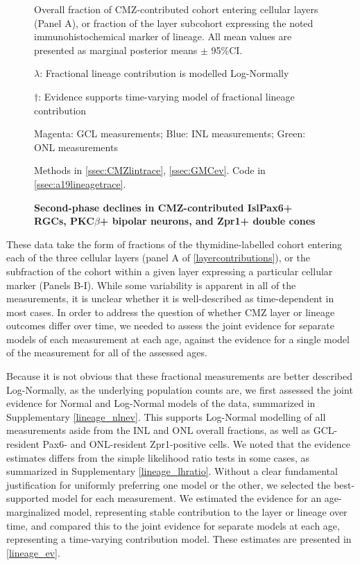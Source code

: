 \begin{figure}[!h]
    \caption{{\bf Second-phase declines in CMZ-contributed Isl\/Pax6+ RGCs, PKC$\beta$+ bipolar neurons, and Zpr1+ double cones}}
    Overall fraction of CMZ-contributed cohort entering cellular layers (Panel A), or fraction of the layer subcohort expressing the noted immunohistochemical marker of lineage. All mean values are presented as marginal posterior means $\pm$ 95\%CI.

    $\lambda$: Fractional lineage contribution is modelled Log-Normally

    $\dagger$: Evidence supports time-varying model of fractional lineage contribution

    Magenta: GCL measurements; Blue: INL measurements; Green: ONL measurements

    Methods in \autoref{ssec:CMZlintrace}, \autoref{ssec:GMCev}.
    Code in \autoref{ssec:a19lineagetrace}.    
    \label{layercontributions}
\end{figure}

These data take the form of fractions of the thymidine-labelled cohort entering each of the three cellular layers (panel A of \autoref{layercontributions}), or the subfraction of the cohort within a given layer expressing a particular cellular marker (Panels B-I). While some variability is apparent in all of the measurements, it is unclear whether it is well-described as time-dependent in most cases. In order to address the question of whether CMZ layer or lineage outcomes differ over time, we needed to assess the joint evidence for separate models of each measurement at each age, against the evidence for a single model of the measurement for all of the assessed ages. 

Because it is not obvious that these fractional measurements are better described Log-Normally, as the underlying population counts are, we first assessed the joint evidence for Normal and Log-Normal models of the data, summarized in Supplementary \autoref{lineage_nlnev}. This supports Log-Normal modelling of all measurements aside from the INL and ONL overall fractions, as well as GCL-resident Pax6- and ONL-resident Zpr1-positive cells. We noted that the evidence estimates differs from the simple likelihood ratio tests in some cases, as summarized in Supplementary \autoref{lineage_lhratio}.  Without a clear fundamental justification for uniformly preferring one model or the other, we selected the best-supported model for each measurement. We estimated the evidence for an age-marginalized model, representing stable contribution to the layer or lineage over time, and compared this to the joint evidence for separate models at each age, representing a time-varying contribution model. These estimates are presented in \autoref{lineage_ev}.

